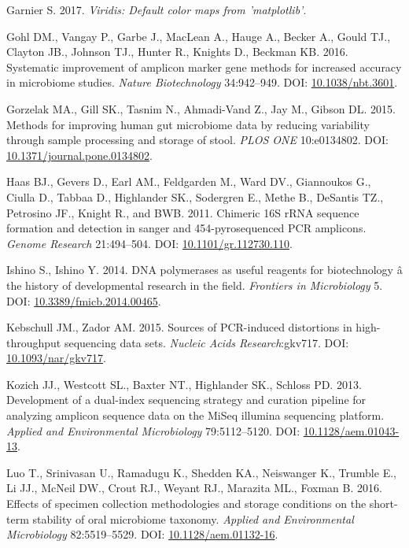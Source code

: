 \documentclass[12pt,]{article}
\begin{document}
\hypertarget{ref-viridis_citation_2017}{}
Garnier S. 2017. \emph{Viridis: Default color maps from 'matplotlib'}.

\hypertarget{ref-taq_Gohl_2016}{}
Gohl DM., Vangay P., Garbe J., MacLean A., Hauge A., Becker A., Gould
TJ., Clayton JB., Johnson TJ., Hunter R., Knights D., Beckman KB. 2016.
Systematic improvement of amplicon marker gene methods for increased
accuracy in microbiome studies. \emph{Nature Biotechnology} 34:942--949.
DOI: \href{https://doi.org/10.1038/nbt.3601}{10.1038/nbt.3601}.

\hypertarget{ref-Gorzelak2015}{}
Gorzelak MA., Gill SK., Tasnim N., Ahmadi-Vand Z., Jay M., Gibson DL.
2015. Methods for improving human gut microbiome data by reducing
variability through sample processing and storage of stool. \emph{PLOS
ONE} 10:e0134802. DOI:
\href{https://doi.org/10.1371/journal.pone.0134802}{10.1371/journal.pone.0134802}.

\hypertarget{ref-Haas2011}{}
Haas BJ., Gevers D., Earl AM., Feldgarden M., Ward DV., Giannoukos G.,
Ciulla D., Tabbaa D., Highlander SK., Sodergren E., Methe B., DeSantis
TZ., Petrosino JF., Knight R., and BWB. 2011. Chimeric 16S rRNA sequence
formation and detection in sanger and 454-pyrosequenced PCR amplicons.
\emph{Genome Research} 21:494--504. DOI:
\href{https://doi.org/10.1101/gr.112730.110}{10.1101/gr.112730.110}.

\hypertarget{ref-polymerase_Ishino_2014}{}
Ishino S., Ishino Y. 2014. DNA polymerases as useful reagents for
biotechnology â the history of developmental research in the field.
\emph{Frontiers in Microbiology} 5. DOI:
\href{https://doi.org/10.3389/fmicb.2014.00465}{10.3389/fmicb.2014.00465}.

\hypertarget{ref-Kebschull2015}{}
Kebschull JM., Zador AM. 2015. Sources of PCR-induced distortions in
high-throughput sequencing data sets. \emph{Nucleic Acids
Research}:gkv717. DOI:
\href{https://doi.org/10.1093/nar/gkv717}{10.1093/nar/gkv717}.

\hypertarget{ref-protocol_Kozich_2013}{}
Kozich JJ., Westcott SL., Baxter NT., Highlander SK., Schloss PD. 2013.
Development of a dual-index sequencing strategy and curation pipeline
for analyzing amplicon sequence data on the MiSeq illumina sequencing
platform. \emph{Applied and Environmental Microbiology} 79:5112--5120.
DOI: \href{https://doi.org/10.1128/aem.01043-13}{10.1128/aem.01043-13}.

\hypertarget{ref-preservation_Luo_2016}{}
Luo T., Srinivasan U., Ramadugu K., Shedden KA., Neiswanger K., Trumble
E., Li JJ., McNeil DW., Crout RJ., Weyant RJ., Marazita ML., Foxman B.
2016. Effects of specimen collection methodologies and storage
conditions on the short-term stability of oral microbiome taxonomy.
\emph{Applied and Environmental Microbiology} 82:5519--5529. DOI:
\href{https://doi.org/10.1128/aem.01132-16}{10.1128/aem.01132-16}.
\end{document}
